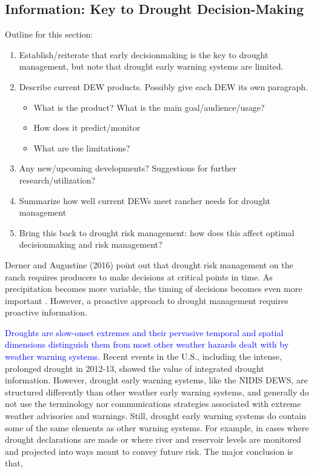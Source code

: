 \documentclass[11pt]{article}
\begin{document}
\subsection{Information: Key to Drought Decision-Making}
Outline for this section:
\begin{enumerate}
\item Establish/reiterate that early decisionmaking is the key to drought management, but note that drought early warning systems are limited.
\item Describe current DEW products. Possibly give each DEW its own paragraph. 
	\begin{itemize}
	\item What is the product? What is the main goal/audience/usage?
	\item How does it predict/monitor
	\item What are the limitations?
	\end{itemize}
\item Any new/upcoming developments? Suggestions for further research/utilization?
\item Summarize how well current DEWs meet rancher needs for drought management
\item Bring this back to drought risk management: how does this affect optimal decisionmaking and risk management?
\end{enumerate}

Derner and Augustine (2016) point out that drought risk management on the ranch requires producers to make decisions at critical points in time. As precipitation becomes more variable, the timing of decisions becomes even more important \cite{Derner2016}. However, a proactive approach to drought management requires proactive information.



\textcolor{blue}{Droughts are slow-onset extremes and their pervasive temporal and spatial dimensions distinguish them from most other weather hazards dealt with by weather warning systems.} Recent events in the U.S., including the intense, prolonged drought in 2012-13, showed the value of integrated drought information. 
However, drought early warning systems, like the NIDIS DEWS, are structured differently than other weather early warning systems, and generally do not use the terminology nor communications strategies associated with extreme weather advisories and warnings.
Still, drought early warning systems do contain some of the same elements as other warning systems. 
For example, in cases where drought declarations are made or where river and reservoir levels are monitored and projected into ways meant to convey future risk. 
The major conclusion is that, 
\end{document}
